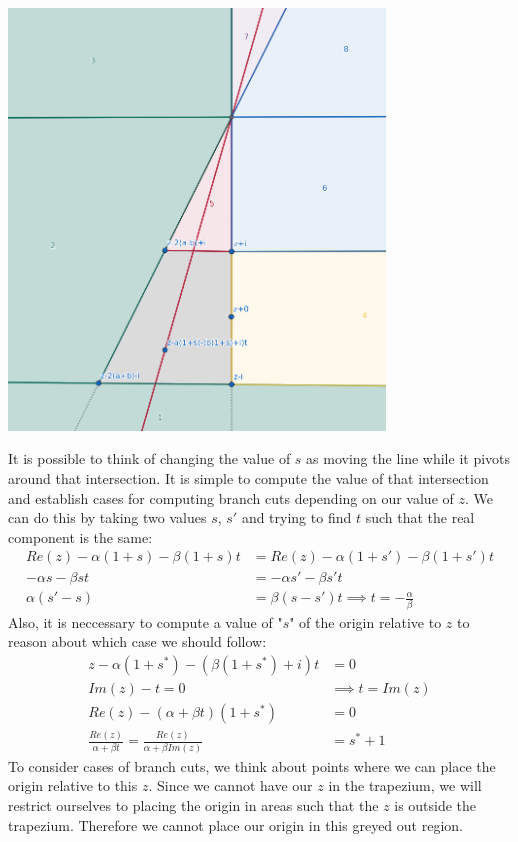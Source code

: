 \documentclass{article}
\begin{document}
\begin{center}\includegraphics[width=0.75\textwidth]{ok2}\end{center}
It is possible to think of changing the value of $s$ as moving the line while it pivots around that intersection.
It is simple to compute the value of that intersection and establish cases for computing branch cuts depending on our value of $z$.
We can do this by taking two values $s$, $s'$ and trying to find $t$ such that the real component is the same:
\begin{align}
    Re(z)-\alpha(1+s)-\beta(1+s)t&=Re(z)-\alpha(1+s')-\beta(1+s')t\\
    -\alpha s-\beta st&=-\alpha s'-\beta s't\\
    \alpha(s'-s)&=\beta(s-s')t \implies t=-\frac{\alpha}{\beta}
\end{align}
Also, it is neccessary to compute a value of "$s$" of the origin relative to $z$ to reason about which case we should follow:
\begin{align}
    z-\alpha(1+s^*)-(\beta(1+s^*)+i)t&=0\\
    Im(z)-t=0 &\implies t=Im(z)\\
    Re(z)-(\alpha+\beta t)(1+s^*)&=0\\
    \frac{Re(z)}{\alpha+\beta t}=\frac{Re(z)}{\alpha+\beta Im(z)}&=s^*+1
\end{align}
To consider cases of branch cuts, we think about points where we can place the origin relative to this $z$.
Since we cannot have our $z$ in the trapezium, we will restrict ourselves to placing the origin in areas such that the $z$ is outside the trapezium.
Therefore we cannot place our origin in this greyed out region.
\end{document}
